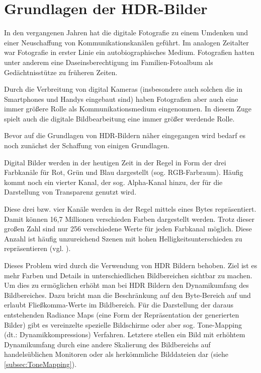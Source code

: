 
\chapter{Grundlagen der HDR-Bilder}
\label{chap:hdr}


In den vergangenen Jahren hat die digitale Fotografie zu einem Umdenken und einer Neuschaffung von Kommunikationskanälen geführt. Im analogen Zeitalter war Fotografie in erster Linie ein autobiographisches Medium. Fotografien hatten unter anderem eine Daseinsberechtigung im Familien-Fotoalbum als Gedächtnisstütze zu früheren Zeiten.

Durch die Verbreitung von digital Kameras (insbesondere auch solchen die in Smartphones und Handys eingebaut sind) haben Fotografien aber auch eine immer größere Rolle als Kommunikationsmedium eingenommen. 
In diesem Zuge spielt auch die digitale Bildbearbeitung eine immer größer werdende Rolle. 

Bevor auf die Grundlagen von \gls{HDR}-Bildern näher eingegangen wird bedarf es noch zunächst der Schaffung von einigen Grundlagen.

Digital Bilder werden in der heutigen Zeit in der Regel in Form der drei Farbkanäle für Rot, Grün und Blau dargestellt (sog. \gls{RGB-Farbraum}). Häufig kommt noch ein vierter Kanal, der sog. Alpha-Kanal hinzu, der für die Darstellung von Transparenz genutzt wird. 

Diese drei bzw. vier Kanäle werden in der Regel mittels eines Bytes repräsentiert. Damit können 16,7 Millionen verschieden Farben dargestellt werden. Trotz dieser großen Zahl sind nur 256 verschiedene Werte für jeden Farbkanal möglich. Diese Anzahl ist häufig unzureichend Szenen mit hohen Helligkeitsunterschieden zu repräsentieren (vgl. \cite[S.~1f]{Reinhard}).

Dieses Problem wird durch die Verwendung von \gls{HDR} Bildern behoben. Ziel ist es mehr Farben und Details in unterschiedlichen Bildbereichen sichtbar zu machen. Um dies zu ermöglichen erhöht man bei \gls{HDR} Bildern den \gls{Dynamikumfang} des Bildbereiches. Dazu bricht man die Beschränkung auf den Byte-Bereich auf und erlaubt Fließkomma-Werte im Bildbereich. Für die Darstellung der daraus entstehenden \glspl{Radiance Map} (eine Form der Repräsentation der generierten Bilder) gibt es vereinzelte spezielle Bildschirme oder aber sog. \gls{Tone-Mapping} (dt.: Dynamikkompressions) Verfahren. Letztere stellen ein Bild mit erhöhtem \gls{Dynamikumfang} durch eine andere Skalierung des Bildbereichs auf handelsüblichen Monitoren oder als herkömmliche Bilddateien dar (siehe \autoref{subsec:ToneMapping}).

